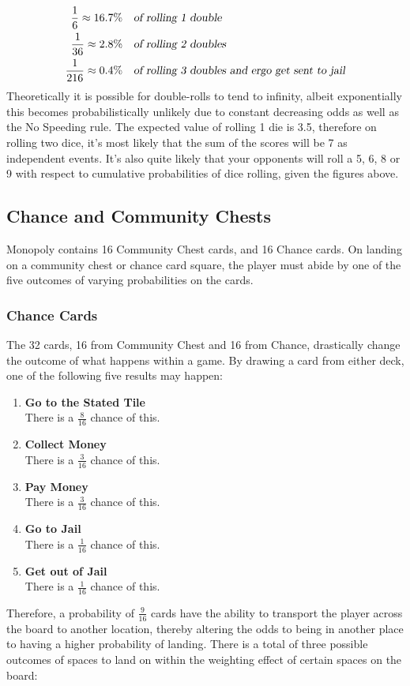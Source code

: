 \documentclass[12pt]{article}
\begin{document}
\begin{align*}
\frac{1}{6}\approx16.7\% \quad &\textsl{of rolling 1 double}\\
\frac{1}{36}\approx2.8\% \quad &\textsl{of rolling 2 doubles}\\
\frac{1}{216}\approx0.4\% \quad &\textsl{of rolling 3 doubles and ergo get sent to jail} 
\end{align*}
Theoretically it is possible for double-rolls to tend to infinity, albeit exponentially this becomes probabilistically unlikely due to constant decreasing odds as well as the No Speeding rule.
The expected value of rolling 1 die is 3.5, therefore on rolling two dice, it's most likely that the sum of the scores will be 7 as independent events. It's also quite likely that your opponents will roll a 5, 6, 8 or 9 with respect to cumulative probabilities of dice rolling, given the figures above.
\subsection{Chance and Community Chests}
Monopoly contains 16 Community Chest cards, and 16 Chance cards. On landing on a community chest or chance card square, the player must abide by one of the five outcomes of varying probabilities on the cards.

\subsubsection{Chance Cards}
\label{Chance Card Probabilities}
The 32 cards, 16 from Community Chest and 16 from Chance, drastically change the outcome of what happens within a game. By drawing a card from either deck, one of the following five results may happen:
\begin{enumerate}
  \item \textbf{Go to the Stated Tile} \hfill\\
  There is a $\frac{8}{16}$ chance of this.
  \item \textbf{Collect Money} \hfill\\
  There is a $\frac{3}{16}$ chance of this.
  \item \textbf{Pay Money} \hfill\\
  There is a $\frac{3}{16}$ chance of this.
  \item \textbf{Go to Jail} \hfill\\
  There is a $\frac{1}{16}$ chance of this.
  \item \textbf{Get out of Jail} \hfill\\
  There is a $\frac{1}{16}$ chance of this.
\end{enumerate}
Therefore, a probability of $\frac{9}{16}$ cards have the ability to transport the player across the board to another location, thereby altering the odds to being in another place to having a higher probability of landing. There is a total of three possible outcomes of spaces to land on within the weighting effect of certain spaces on the board:
\end{document}
